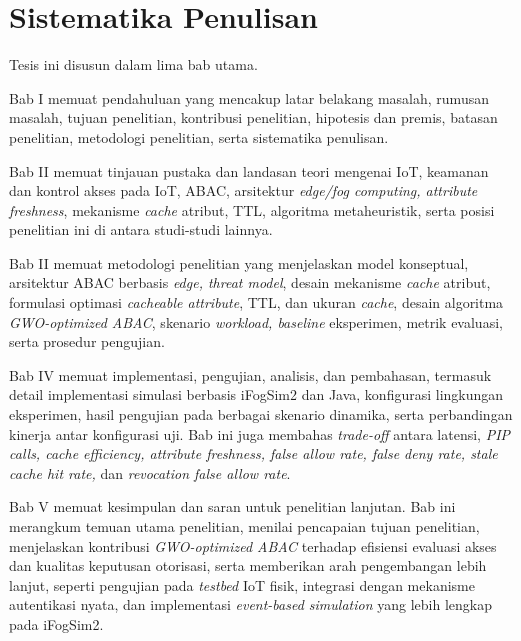 \section{Sistematika Penulisan}

Tesis ini disusun dalam lima bab utama.

Bab I memuat pendahuluan yang mencakup latar belakang masalah, rumusan masalah, tujuan penelitian, kontribusi penelitian, hipotesis dan premis, batasan penelitian, metodologi penelitian, serta sistematika penulisan.

Bab II memuat tinjauan pustaka dan landasan teori mengenai IoT, keamanan dan kontrol akses pada IoT, ABAC, arsitektur \textit{edge/fog computing, attribute freshness}, mekanisme \textit{cache} atribut, TTL, algoritma metaheuristik, serta posisi penelitian ini di antara studi-studi lainnya.

Bab II memuat metodologi penelitian yang menjelaskan model konseptual, arsitektur ABAC berbasis \textit{edge, threat model}, desain mekanisme \textit{cache} atribut, formulasi optimasi \textit{cacheable attribute}, TTL, dan ukuran \textit{cache}, desain algoritma \textit{GWO-optimized ABAC}, skenario \textit{workload, baseline} eksperimen, metrik evaluasi, serta prosedur pengujian.

Bab IV memuat implementasi, pengujian, analisis, dan pembahasan, termasuk detail implementasi simulasi berbasis iFogSim2 dan Java, konfigurasi lingkungan eksperimen, hasil pengujian pada berbagai skenario dinamika, serta perbandingan kinerja antar konfigurasi uji. Bab ini juga membahas \textit{trade-off} antara latensi, \textit{PIP calls, cache efficiency, attribute freshness, false allow rate, false deny rate, stale cache hit rate,} dan \textit{revocation false allow rate}.

Bab V memuat kesimpulan dan saran untuk penelitian lanjutan. Bab ini merangkum temuan utama penelitian, menilai pencapaian tujuan penelitian, menjelaskan kontribusi \textit{GWO-optimized ABAC} terhadap efisiensi evaluasi akses dan kualitas keputusan otorisasi, serta memberikan arah pengembangan lebih lanjut, seperti pengujian pada \textit{testbed} IoT fisik, integrasi dengan mekanisme autentikasi nyata, dan implementasi \textit{event-based simulation} yang lebih lengkap pada iFogSim2.